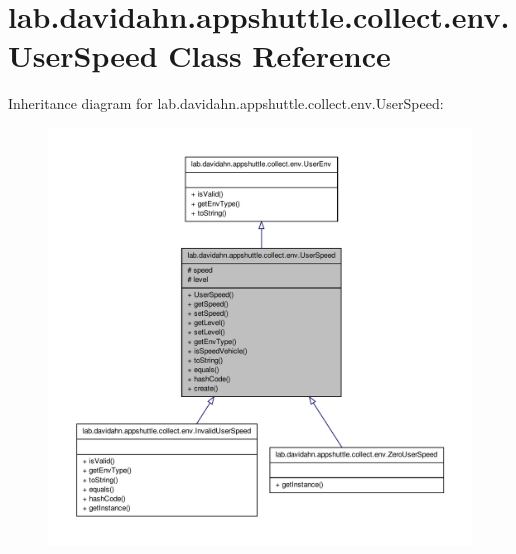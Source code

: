 \hypertarget{classlab_1_1davidahn_1_1appshuttle_1_1collect_1_1env_1_1_user_speed}{\section{lab.\-davidahn.\-appshuttle.\-collect.\-env.\-User\-Speed \-Class \-Reference}
\label{classlab_1_1davidahn_1_1appshuttle_1_1collect_1_1env_1_1_user_speed}
}


\-Inheritance diagram for lab.\-davidahn.\-appshuttle.\-collect.\-env.\-User\-Speed\-:
\nopagebreak
\begin{figure}[H]
\begin{center}
\leavevmode
\includegraphics[width=350pt]{classlab_1_1davidahn_1_1appshuttle_1_1collect_1_1env_1_1_user_speed__inherit__graph}
\end{center}
\end{figure}


